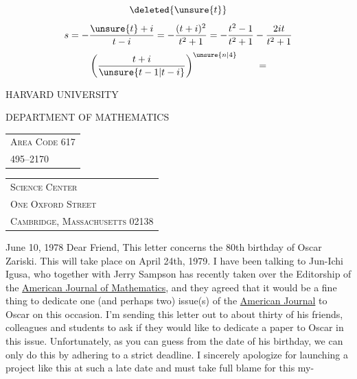 \[\deleted{\unsure{t}}\]
\[
s=-\frac{\unsure{t}+i}{t-i}=-\frac{(t+i)^2}{t^2+1}=-\frac{t^2-1}{t^2+1}-\frac{2it}{t^2+1}
\]
\[
\left(\frac{t+i}{\unsure{t-1|t-i}}\right)^{\unsure{n|4}}\qquad=
\]

HARVARD UNIVERSITY

DEPARTMENT OF MATHEMATICS
\begin{tabular}{l}
\textsc{Area Code 617}\\
495--2170
\end{tabular}
\begin{tabular}{l}
\textsc{Science Center}\\
\textsc{One Oxford Street}\\
\textsc{Cambridge, Massachusetts 02138}
\end{tabular}
June 10, 1978
Dear Friend,
This letter concerns the 80th birthday of Oscar Zariski. This will take place on April 24th, 1979. I have been talking to Jun-Ichi Igusa, who together with Jerry Sampson has recently taken over the Editorship of the \uline{American Journal of Mathematics}, and they agreed that it would be a fine thing to dedicate one (and perhaps two) issue(s) of the \uline{American Journal} to Oscar on this occasion. I'm sending this letter out to about thirty of his friends, colleagues and students to ask if they would like to dedicate a paper to Oscar in this issue. Unfortunately, as you can guess from the date of his birthday, we can only do this by adhering to a strict deadline. I sincerely apologize for launching a project like this at such a late date and must take full blame for this my-\\
